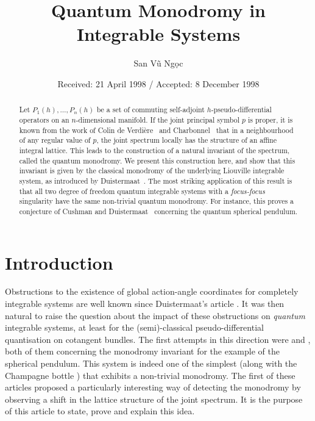 \documentclass[cmp]{svjour}  %
\begin{document}
\title{{Quantum Monodromy in Integrable Systems}}

\author{San V\~u Ng\d oc\fnmsep{}}

\date{Received: 21 April 1998 / Accepted: 8 December 1998}

\maketitle
\begin{abstract}
  Let $P_1(h),\dots,P_n(h)$ be a set of commuting self-adjoint
  $h$-pseudo-differen\-tial operators on an $n$-dimensional manifold. If the joint principal
  symbol $p$ is proper, it is known from the work of Colin de
  Verdi\`ere~\cite{colinII} and Charbonnel~\cite{charbonnel} that in a
  neighbourhood of any regular value of $p$, the joint spectrum
  locally has the structure of an affine integral lattice. This leads
  to the construction of a natural invariant of the spectrum, called
  the quantum monodromy. We present this construction here, and show
  that this invariant is given by the classical monodromy of the
  underlying Liouville integrable system, as introduced by
  Duistermaat~\cite{duistermaat}. The most striking application of
  this result is that all two degree of freedom quantum integrable
  systems with a \emph{focus-focus} singularity have the same
  non-trivial quantum monodromy. For instance, this proves a
  conjecture of Cushman and Duistermaat~\cite{duist-cushman}
  concerning the quantum spherical pendulum.
\end{abstract}

\section{Introduction}
Obstructions to the existence of global action-angle coordinates for
completely integrable systems are well known since Duistermaat's
article \cite{duistermaat}.  It was then natural to raise the question
about the impact of these obstructions on \emph{quantum} integrable
systems, at least for the (semi)-classical pseudo-differential
quantisation on cotangent bundles.  The first attempts in this
direction were \cite{duist-cushman} and \cite{guillemin-uribe}, both
of them concerning the monodromy invariant for the example of the
spherical pendulum.  This system is indeed one of the simplest (along
with the Champagne bottle \cite{bates}) that exhibits a non-trivial
monodromy. The first of these articles \cite{duist-cushman}
proposed a particularly interesting way of detecting the monodromy by
observing a shift in the lattice structure of the joint spectrum. It
is the purpose of this article to state, prove and explain this idea.
\end{document}
